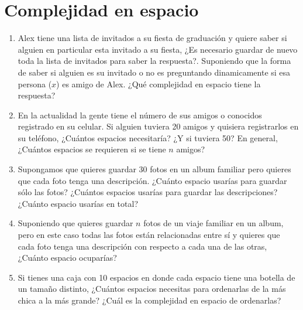\documentclass[12pt]{article} %
\begin{document}
\section{Complejidad en espacio}
\begin{enumerate}
\item  Alex tiene una lista de invitados a su fiesta de graduación y quiere saber si alguien en particular esta invitado a su fiesta, ¿Es necesario guardar de nuevo toda la lista de invitados para saber la respuesta?. Suponiendo que la forma de saber si alguien es su invitado o no es preguntando dinamicamente si esa persona ($x$) es amigo de Alex. ¿Qué complejidad en espacio tiene la respuesta?
\item En la actualidad la gente tiene el número de sus amigos o conocidos registrado en su celular. Si alguien tuviera 20 amigos y quisiera registrarlos en su teléfono, ¿Cuántos espacios necesitaría? ¿Y si tuviera 50? 
En general, ¿Cuántos espacios se requieren si se tiene $n$ amigos?
\item Supongamos que quieres guardar 30 fotos en un album familiar pero quieres que cada foto tenga una descripción. ¿Cuánto espacio usarías para guardar sólo las fotos? ¿Cuántos espacios usarías para guardar las descripciones? ¿Cuánto espacio usarías en total?
\item Suponiendo que quieres guardar $n$ fotos de un viaje familiar en un album, pero en este caso todas las fotos están relacionadas entre sí y quieres que cada foto tenga una descripción con respecto a cada una de las otras, ¿Cuánto espacio ocuparías?
\item Si tienes una caja con 10 espacios en donde cada espacio tiene una botella de un tamaño distinto, ¿Cuántos espacios necesitas para ordenarlas de la más chica a la más grande? ¿Cuál es la complejidad en espacio de ordenarlas?
\end{enumerate}
\end{document}
